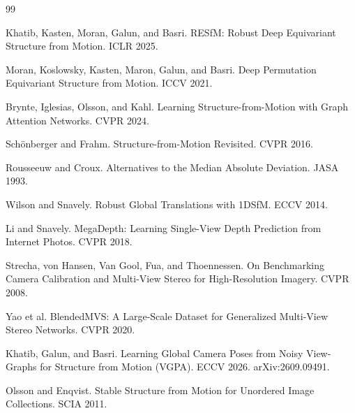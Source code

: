\documentclass[10pt,twocolumn,letterpaper]{article}
\begin{document}
\label{sec:endcontent}%
\begin{thebibliography}{99}\small

 Khatib, Kasten, Moran, Galun, and Basri. RESfM: Robust Deep Equivariant Structure from Motion. ICLR 2025.

 Moran, Koslowsky, Kasten, Maron, Galun, and Basri. Deep Permutation Equivariant Structure from Motion. ICCV 2021.

 Brynte, Iglesias, Olsson, and Kahl. Learning Structure-from-Motion with Graph Attention Networks. CVPR 2024.

 Sch\"onberger and Frahm. Structure-from-Motion Revisited. CVPR 2016.

 Rousseeuw and Croux. Alternatives to the Median Absolute Deviation. JASA 1993.

 Wilson and Snavely. Robust Global Translations with 1DSfM. ECCV 2014.

 Li and Snavely. MegaDepth: Learning Single-View Depth Prediction from Internet Photos. CVPR 2018.

 Strecha, von Hansen, Van Gool, Fua, and Thoennessen. On Benchmarking Camera Calibration and Multi-View Stereo for High-Resolution Imagery. CVPR 2008.

 Yao et al. BlendedMVS: A Large-Scale Dataset for Generalized Multi-View Stereo Networks. CVPR 2020.

 Khatib, Galun, and Basri. Learning Global Camera Poses from Noisy View-Graphs for Structure from Motion (VGPA). ECCV 2026. arXiv:2609.09491.

 Olsson and Enqvist. Stable Structure from Motion for Unordered Image Collections. SCIA 2011.

\end{thebibliography}
\end{document}
